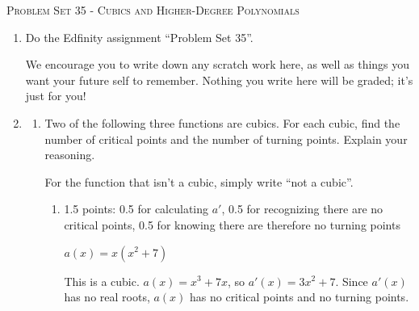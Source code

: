 \documentclass{article}
\newcommand{\doedfinity}[2][\newpage]{
  \begin{problem}[#1]
    Do the Edfinity assignment ``Problem Set #2''.

    We encourage you to write down any scratch work here, as well as
    things you want your future self to remember. Nothing you write
    here will be graded; it's just for you!
  \end{problem}
}
\begin{document}
\begin{center}
  \large\textsc{Problem Set 35 - Cubics and Higher-Degree Polynomials}
\end{center}


\begin{enumerate}
\item  {}

  \doedfinity{35}

\item  


  \begin{enumerate}
  \item Two of the following three functions are cubics. For each cubic, find the number of critical points and the number of turning points. Explain your reasoning.

    For the function that isn't a cubic, simply write ``not a cubic''.

    \begin{enumerate}
    \item

      \begin{grading}
        1.5 points: 0.5 for calculating $a'$, 0.5 for recognizing there are no critical points, 0.5 for knowing there are therefore no turning points
      \end{grading}

      \begin{problem}[\vfill]
        $a(x) = x (x^2 + 7)$
      \end{problem}

      \begin{solution}
        This is a cubic. $a(x)=x^3+7x$, so $a'(x)=3x^2+7$. Since $a'(x)$
        has no real roots, $a(x)$ has no critical points and no turning
        points.
      \end{solution}


\end{enumerate}
\end{enumerate}
\end{enumerate}
\end{document}

